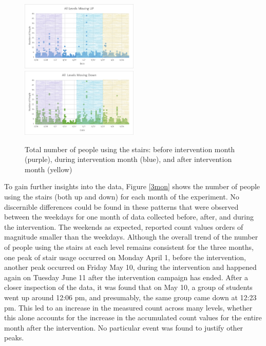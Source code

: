 \begin{figure}[b]
    \includegraphics[width=0.5\textwidth]{image/Chapters/Chapter6/up.png}%
    \includegraphics[width=0.5\textwidth]{image/Chapters/Chapter6/down.png}
    \caption{Total number of people using the stairs: before intervention month (purple), during intervention month (blue), and after intervention month (yellow)}
    \label{updown}
\end{figure}



To gain further insights into the data, Figure \ref{3mon} shows the number of people using the stairs (both up and down) for each month of the experiment. No discernible differences could be found in these patterns that were observed between the weekdays for one month of data collected before, after, and during the intervention. The weekends as expected, reported count values orders of magnitude smaller than the weekdays. Although the overall trend of the number of people using the stairs at each level remains consistent for the three months, one peak of stair usage occurred on Monday April 1, before the intervention, another peak occurred on Friday May 10, during the intervention and happened again on Tuesday June 11 after the intervention campaign has ended.
After a closer inspection of the data, it was found that on May 10, a group of students went up around 12:06 pm, and presumably, the same group came down at 12:23 pm. This led to an increase in the measured count across many levels, whether this alone accounts for the increase in the accumulated count values for the entire month after the intervention. No particular event was found to justify other peaks. 


